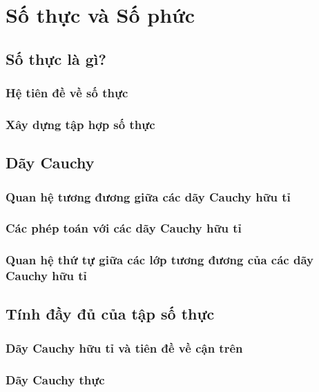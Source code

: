 \chapter{Số thực và Số phức}\label{chapter5:real-numbers-and-complex-numbers}

\section{Số thực là gì?}

\subsection*{Hệ tiên đề về số thực}

\subsection*{Xây dựng tập hợp số thực}

\section{Dãy Cauchy}

\subsection*{Quan hệ tương đương giữa các dãy Cauchy hữu tỉ}

\subsection*{Các phép toán với các dãy Cauchy hữu tỉ}

\subsection*{Quan hệ thứ tự giữa các lớp tương đương của các dãy Cauchy hữu tỉ}

\section{Tính đầy đủ của tập số thực}

\subsection*{Dãy Cauchy hữu tỉ và tiên đề về cận trên}

\subsection*{Dãy Cauchy thực}

